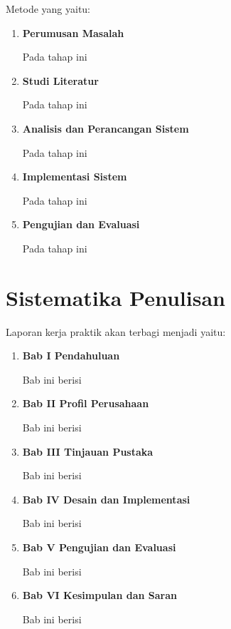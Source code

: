 Metode yang \lipsum[7][1-5] yaitu:

\begin{enumerate}[nolistsep]

  \item \textbf{Perumusan Masalah}

  Pada tahap ini \lipsum[7][6-9]

  \item \textbf{Studi Literatur}

  Pada tahap ini \lipsum[7][10-13]

  \item \textbf{Analisis dan Perancangan Sistem}

  Pada tahap ini \lipsum[8][1-2]

  \item \textbf{Implementasi Sistem}

  Pada tahap ini \lipsum[8][3-6]

  \item \textbf{Pengujian dan Evaluasi}

  Pada tahap ini \lipsum[8][7-12]

\end{enumerate}

\section{Sistematika Penulisan}

Laporan kerja praktik akan terbagi menjadi \lipsum[9][1] yaitu:

\begin{enumerate}[nolistsep]

  \item \textbf{Bab I Pendahuluan}

  Bab ini berisi \lipsum[9][2-4]

  \item \textbf{Bab II Profil Perusahaan}

  Bab ini berisi \lipsum[9][5-7]

  \item \textbf{Bab III Tinjauan Pustaka}

  Bab ini berisi \lipsum[9][8]

  \item \textbf{Bab IV Desain dan Implementasi}

  Bab ini berisi \lipsum[10][1-2]

  \item \textbf{Bab V Pengujian dan Evaluasi}

  Bab ini berisi \lipsum[10][3-4]

  \item \textbf{Bab VI Kesimpulan dan Saran}

  Bab ini berisi \lipsum[10][5-8]

\end{enumerate}
